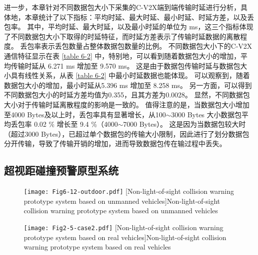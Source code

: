 进一步，本章针对不同数据包大小下采集的C-V2X端到端传输时延进行分析，具体地，本章统计了以下指标：平均时延、最大时延、最小时延、时延方差，以及丢包率。
其中，平均时延、最大时延，以及最小时延的单位为 ms，这三个指标体现了不同数据包大小下取得的时延特征，而时延方差表示了传输时延数据的离散程度。
丢包率表示丢包数量占整体数据包数量的比例。
不同数据包大小下的C-V2X通信特征显示在表 \ref{table 6-2} 中，特别地，可以看到随着数据包大小的增加，平均传输时延从 6.271 ms 增加至 9.570 ms。
这是由于数据包传输时延与数据包大小具有线性关系，从表 \ref{table 6-2} 中最小时延数据也能体现。
可以观察到，随着数据包大小的增加，最小时延从5.396 ms 增加至 8.258 ms。
另一方面，可以得到不同数据包大小的时延方差均值为0.355，且其方差为0.0028。
显然，不同数据包大小对于传输时延离散程度的影响是一致的。
值得注意的是，当数据包大小增加至4000 Bytes及以上时，丢包率具有显著增长，从100$\sim$3000 Bytes 大小数据包平均丢包率 0.02 \% 增长至 9.4 \%（4000$\sim$7000 Bytes）。
这是因为当数据包较大时（超过3000 Bytes），已超过单个数据包的传输大小限制，因此进行了划分数据包分开传输，导致了传输开销的增加，进而导致数据包传在输过程中丢失。

\subsection{超视距碰撞预警原型系统}


\begin{figure}[h]
\centering
  \texttt{[image: Fig6-12-outdoor.pdf]}
  [Non-light-of-sight collision warning prototype system based on unmanned vehicles]{Non-light-of-sight collision warning prototype system based on unmanned vehicles}
  \label{fig 5-12}
\end{figure}


\begin{figure}[h] 
	\centering
	\texttt{[image: Fig2-5-case2.pdf]}
	[Non-light-of-sight collision warning prototype system based on real vehicles]{Non-light-of-sight collision warning prototype system based on real vehicles}
	\label{fig 2-5}
\end{figure}

